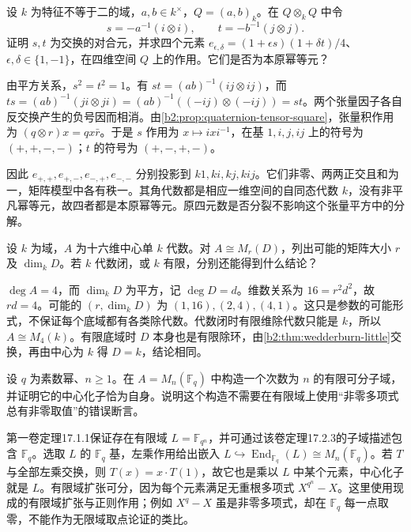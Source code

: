 \begin{exercise}\label{b2:ex:17-quaternion-tensor-square}
	设 \(k\) 为特征不等于二的域，\(a,b\in k^\times\)，\(Q=(a,b)_k\)。在 \(Q\otimes_kQ\) 中令
	\[
		s=-a^{-1}(i\otimes i),\qquad t=-b^{-1}(j\otimes j).
	\]
	证明 \(s,t\) 为交换的对合元，并求四个元素 \(e_{\epsilon,\delta}=(1+\epsilon s)(1+\delta t)/4\)、\(\epsilon,\delta\in\{1,-1\}\)，在四维空间 \(Q\) 上的作用。它们是否为本原幂等元？
\end{exercise}
\begin{solution}
	由平方关系，\(s^2=t^2=1\)。有 \(st=(ab)^{-1}(ij\otimes ij)\)，而 \(ts=(ab)^{-1}(ji\otimes ji)=(ab)^{-1}((-ij)\otimes(-ij))=st\)。两个张量因子各自反交换产生的负号因而相消。由\cref{b2:prop:quaternion-tensor-square}，张量积作用为 \((q\otimes r)x=qx\bar r\)。于是 \(s\) 作用为 \(x\mapsto ixi^{-1}\)，在基 \(1,i,j,ij\) 上的符号为 \((+,+,-,-)\)；\(t\) 的符号为 \((+,-,+,-)\)。

	因此 \(e_{+,+},e_{+,-},e_{-,+},e_{-,-}\) 分别投影到 \(k1,ki,kj,kij\)。它们非零、两两正交且和为一，矩阵模型中各有秩一。其角代数都是相应一维空间的自同态代数 \(k\)，没有非平凡幂等元，故四者都是本原幂等元。原四元数是否分裂不影响这个张量平方中的分解。
\end{solution}

\begin{exercise}\label{b2:ex:17-dimension-sixteen}
	设 \(k\) 为域，\(A\) 为十六维中心单 \(k\) 代数。对 \(A\cong M_r(D)\)，列出可能的矩阵大小 \(r\) 及 \(\dim_kD\)。若 \(k\) 代数闭，或 \(k\) 有限，分别还能得到什么结论？
\end{exercise}
\begin{solution}
	\(\deg A=4\)，而 \(\dim_kD\) 为平方，记 \(\deg D=d\)。维数关系为 \(16=r^2d^2\)，故 \(rd=4\)。可能的 \((r,\dim_kD)\) 为 \((1,16),(2,4),(4,1)\)。这只是参数的可能形式，不保证每个底域都有各类除代数。代数闭时有限维除代数只能是 \(k\)，所以 \(A\cong M_4(k)\)。有限底域时 \(D\) 本身也是有限除环，由\cref{b2:thm:wedderburn-little}交换，再由中心为 \(k\) 得 \(D=k\)，结论相同。
\end{solution}

\begin{exercise}\label{b2:ex:17-finite-field-maximal-subfield}
	设 \(q\) 为素数幂、\(n\ge1\)。在 \(A=M_n(\mathbb F_q)\) 中构造一个次数为 \(n\) 的有限可分子域，并证明它的中心化子恰为自身。说明这个构造不需要在有限域上使用“非零多项式总有非零取值”的错误断言。
\end{exercise}
\begin{solution}
	第一卷定理17.1.1保证存在有限域 \(L=\mathbb F_{q^n}\)，并可通过该卷定理17.2.3的子域描述包含 \(\mathbb F_q\)。选取 \(L\) 的 \(\mathbb F_q\) 基，左乘作用给出嵌入 \(L\hookrightarrow\operatorname{End}_{\mathbb F_q}(L)\cong M_n(\mathbb F_q)\)。若 \(T\) 与全部左乘交换，则 \(T(x)=x\cdot T(1)\)，故它也是乘以 \(L\) 中某个元素，中心化子就是 \(L\)。有限域扩张可分，因为每个元素满足无重根多项式 \(X^{q^n}-X\)。这里使用现成的有限域扩张与正则作用；例如 \(X^q-X\) 虽是非零多项式，却在 \(\mathbb F_q\) 每一点取零，不能作为无限域取点论证的类比。
\end{solution}

